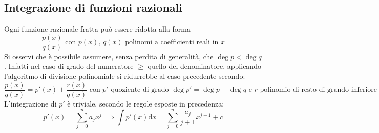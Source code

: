 \documentclass[10pt]{article}
\theoremstyle{plain}
\begin{document}
\subsection{Integrazione di funzioni razionali}
Ogni funzione razionale fratta può essere ridotta alla forma
\[\frac{p(x)}{q(x)} \textrm{  con $p(x)$, $q(x)$ polinomi a coefficienti reali in $x$}\]
Si osservi che è possibile assumere, senza perdita di generalità, che $\deg p < \deg q$. Infatti nel caso di grado del numeratore $\geq$ quello del denominatore, applicando l'algoritmo di divisione polinomiale si ridurrebbe al caso precedente secondo:
\[\frac{p(x)}{q(x)} = p'(x) + \frac{r(x)}{q(x)} \textrm{ con $p'$ quoziente di grado $\deg p' = \deg p - \deg q$ e $r$ polinomio di resto di grando inferiore a $q$}\]
L'integrazione di $p'$ è triviale, secondo le regole esposte in precedenza:
\[p'(x) = \sum \limits_{j=0}^{n}a_j x^j \implies \int p'(x) \textrm{d}x = \sum \limits_{j=0}^{n}\frac{a_j}{j+1} 
 x^{j+1} + c\]
\end{document}
